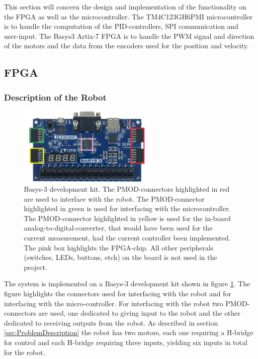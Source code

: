 \documentclass[../../main.tex]{subfiles}
\begin{document}
This section will concern the design and implementation of the functionality on the FPGA as well as the microcontroller. The TM4C123GH6PMI microcontroller is to handle the computation of the PID-controllers, SPI communication and user-input. The Basys3 Artix-7 FPGA is to handle the PWM signal and direction of the motors and the data from the encoders used for the position and velocity. 



\subsection{FPGA} \label{subsec:SystemImplemtationFPGA}
\subsubsection*{Description of the Robot}

\begin{figure}
    \centering
    \includegraphics[width=0.6\textwidth]{Sections/System_Implementation/Images/Basys-3-kit.png}
    \caption{Basys-3 development kit. The PMOD-connectors highlighted in red are used to interface with the robot. The PMOD-connector highlighted in green is used for interfacing with the microcontroller. The PMOD-connector highlighted in yellow is used for the in-board analog-to-digital-converter, that would have been used for the current measurement, had the current controller been implemented. The pink box highlights the FPGA-chip. All other peripherals (switches, LEDs, buttons, etch) on the board is not used in the project.}
    \label{fig:Basys-3-kit}
\end{figure}

The system is implemented on a Basys-3 development kit shown in figure \ref{fig:Basys-3-kit}. The figure highlights the connectors used for interfacing with the robot and for interfacing with the micro-controller. For interfacing with the robot two PMOD-connectors are used, one dedicated to giving input to the robot and the other dedicated to receiving outputs from the robot. As described in section \ref{sec:ProblemDescription} the robot has two motors, each one requiring a H-bridge for control and each H-bridge requiring three inputs, yielding six inputs in total for the robot. 
\end{document}
